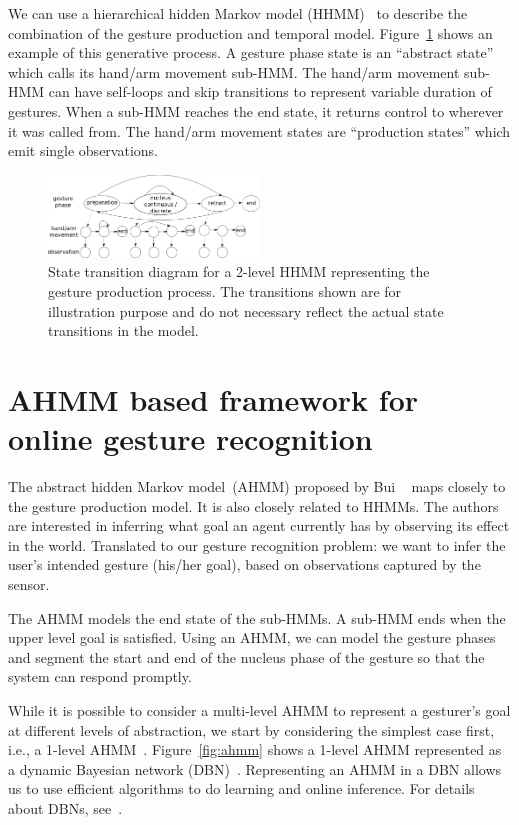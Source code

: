 \documentclass[10pt,twocolumn,letterpaper]{article}
\begin{document}
We can use a hierarchical hidden Markov model (HHMM)~\cite{fine98} to describe the combination of the 
gesture production and temporal model. Figure~\ref{fig:hhmm} shows an example of 
this generative process. A gesture phase state is an ``abstract state'' which 
calls its hand/arm movement sub-HMM. The hand/arm movement sub-HMM can have self-loops 
and skip transitions to represent variable duration of gestures. When a sub-HMM
reaches the end state, it returns control to wherever it was called from. The 
hand/arm movement states are ``production states'' which emit single observations. 

\begin{figure}[h]
  \centering
  \includegraphics[width=0.5\textwidth]{figure/hhmm.png} 
  \caption{State transition diagram for a 2-level HHMM representing the gesture
  production process. The transitions shown are for illustration purpose and do not
  necessary reflect the actual state transitions in the model.}
  \label{fig:hhmm}
\end{figure}

\section{AHMM based framework for online gesture recognition} \label{sec:ahmm}
The abstract hidden Markov model (AHMM) proposed by Bui \etal~\cite{bui00} maps closely to the
gesture production model. It is also closely related to HHMMs. The authors are interested
in inferring what goal an agent currently has by observing its effect in the world. Translated
to our gesture recognition problem: we want to infer the user's intended gesture (his/her goal), based on observations captured by the sensor.  

The AHMM models the end state of the sub-HMMs. A sub-HMM ends when the upper level
goal is satisfied. Using an AHMM, we can model the gesture phases and segment the start and end of the nucleus phase of the gesture
so that the system can respond promptly. 

While it is possible to consider a multi-level AHMM to represent a gesturer's goal at
different levels of abstraction, we start by considering the simplest case first, i.e.,
a 1-level AHMM~\cite{bui01}. Figure~\ref{fig:ahmm} shows a 1-level AHMM represented
as a dynamic Bayesian network (DBN)~\cite{murphy02}. Representing an AHMM in a DBN allows us to use efficient algorithms to do learning
and online inference. For details about DBNs, see~\cite{murphy02}.
\end{document}
